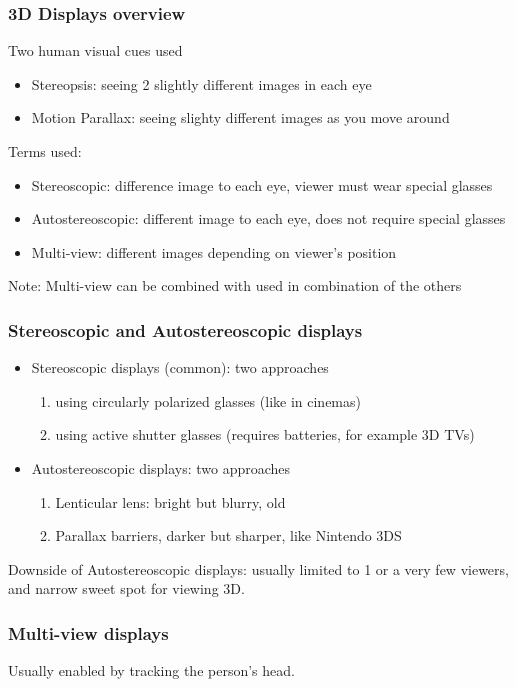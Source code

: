 \documentclass[11pt]{article}
\begin{document}
\subsubsection{3D Displays overview}
Two human visual cues used 
\begin{itemize}
    \item Stereopsis: seeing 2 slightly different images in each eye
    \item Motion Parallax: seeing slighty different images as you move around
\end{itemize}
\noindent
Terms used:
\begin{itemize}
    \item Stereoscopic: difference image to each eye, viewer must wear special glasses
    \item Autostereoscopic: different image to each eye, does not require special glasses
    \item Multi-view: different images depending on viewer's position
\end{itemize}
Note: Multi-view can be combined with used in combination of the others
\newline
\subsubsection{Stereoscopic and Autostereoscopic displays}
\begin{itemize}
    \item Stereoscopic displays (common): two approaches
     \begin{enumerate}
        \item using circularly polarized glasses (like in cinemas)
        \item using active shutter glasses (requires batteries, for example 3D TVs)
    \end{enumerate}
    \item Autostereoscopic displays: two approaches
    \begin{enumerate}
        \item Lenticular lens: bright but blurry, old
        \item Parallax barriers, darker but sharper, like Nintendo 3DS
    \end{enumerate}
\end{itemize}
\noindent
Downside of Autostereoscopic displays: usually limited to 1 or a very few viewers, and narrow sweet spot for viewing 3D.

\subsubsection{Multi-view displays}
Usually enabled by tracking the person's head.
\end{document}
